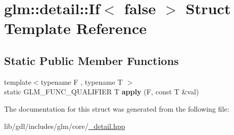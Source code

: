 \hypertarget{structglm_1_1detail_1_1_if_3_01false_01_4}{}\section{glm\+:\+:detail\+:\+:If$<$ false $>$ Struct Template Reference}
\label{structglm_1_1detail_1_1_if_3_01false_01_4}
\subsection*{Static Public Member Functions}
\begin{DoxyCompactItemize}
\item 
\hypertarget{structglm_1_1detail_1_1_if_3_01false_01_4_a31a9409e47dc11cb7d4251c12342b9f6}{}{\footnotesize template$<$typename F , typename T $>$ }\\static G\+L\+M\+\_\+\+F\+U\+N\+C\+\_\+\+Q\+U\+A\+L\+I\+F\+I\+E\+R T {\bfseries apply} (F, const T \&val)\label{structglm_1_1detail_1_1_if_3_01false_01_4_a31a9409e47dc11cb7d4251c12342b9f6}

\end{DoxyCompactItemize}


The documentation for this struct was generated from the following file\+:\begin{DoxyCompactItemize}
\item 
lib/gdl/includes/glm/core/\hyperlink{__detail_8hpp}{\+\_\+detail.\+hpp}\end{DoxyCompactItemize}
